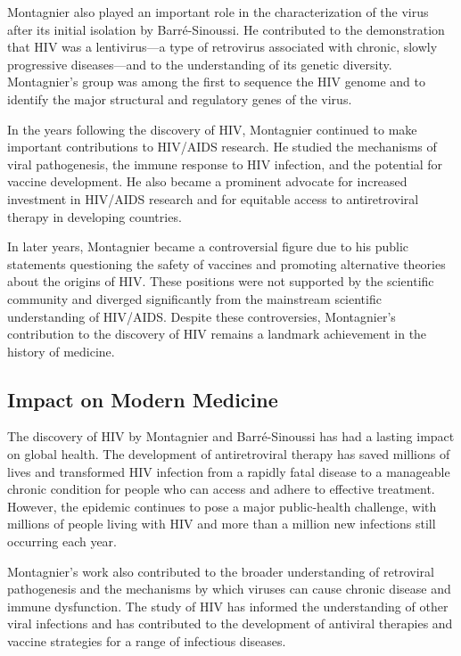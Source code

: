 Montagnier also played an important role in the characterization of the virus after its initial isolation by Barr\'e-Sinoussi. He contributed to the demonstration that HIV was a lentivirus---a type of retrovirus associated with chronic, slowly progressive diseases---and to the understanding of its genetic diversity. Montagnier's group was among the first to sequence the HIV genome and to identify the major structural and regulatory genes of the virus.

In the years following the discovery of HIV, Montagnier continued to make important contributions to HIV/AIDS research. He studied the mechanisms of viral pathogenesis, the immune response to HIV infection, and the potential for vaccine development. He also became a prominent advocate for increased investment in HIV/AIDS research and for equitable access to antiretroviral therapy in developing countries.

In later years, Montagnier became a controversial figure due to his public statements questioning the safety of vaccines and promoting alternative theories about the origins of HIV. These positions were not supported by the scientific community and diverged significantly from the mainstream scientific understanding of HIV/AIDS. Despite these controversies, Montagnier's contribution to the discovery of HIV remains a landmark achievement in the history of medicine.

\subsection{Impact on Modern Medicine}

The discovery of HIV by Montagnier and Barr\'e-Sinoussi has had a lasting impact on global health. The development of antiretroviral therapy has saved millions of lives and transformed HIV infection from a rapidly fatal disease to a manageable chronic condition for people who can access and adhere to effective treatment. However, the epidemic continues to pose a major public-health challenge, with millions of people living with HIV and more than a million new infections still occurring each year.

Montagnier's work also contributed to the broader understanding of retroviral pathogenesis and the mechanisms by which viruses can cause chronic disease and immune dysfunction. The study of HIV has informed the understanding of other viral infections and has contributed to the development of antiviral therapies and vaccine strategies for a range of infectious diseases.

